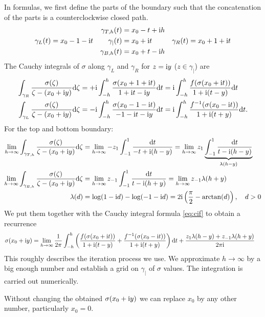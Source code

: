 In formulas, we first define the parts of the boundary such that the
concatenation of the parts is a counterclockwise closed path.
\begin{align*}
  &&\gamma_{T,h}(t)&=x_0-t+\mathrm{i} h&&\\
  \gamma_L(t)&=x_0-1-\mathrm{i} t &\gamma_|(t)&=x_0+\mathrm{i} t& \gamma_R(t)&=x_0+1+\mathrm{i} t\\
  &&\gamma_{B,h}(t)&=x_0+t-\mathrm{i} h&&
\end{align*}
The Cauchy integrals of $\sigma$ along $\gamma_L$ and $\gamma_R$ for
$z=\mathrm{i} y$ ($z\in\gamma_|$) are 
\begin{align*}
  \int_{\gamma_R}\frac{\sigma(\zeta)}{\zeta-(x_0+\mathrm{i} y)}\mathrm{d}\zeta 
   &= +\mathrm{i}\int_{-h}^h \frac{\sigma(x_0+1+\mathrm{i} t)}{1+\mathrm{i} t- \mathrm{i} y} \mathrm{d} t
   = \mathrm{i}\int_{-h}^h \frac{f(\sigma(x_0+\mathrm{i} t))}{1+\mathrm{i} (t-y)} \mathrm{d} t
  \\\int_{\gamma_L}\frac{\sigma(\zeta)}{\zeta-(x_0+\mathrm{i} y)}\mathrm{d}\zeta 
   &=-\mathrm{i}\int_{-h}^h \frac{\sigma(x_0-1-\mathrm{i} t)}{-1-\mathrm{i} t -\mathrm{i} y} \mathrm{d} t
   =\mathrm{i}\int_{-h}^h \frac{f^{-1}(\sigma(x_0-\mathrm{i} t))}{1+\mathrm{i} (t+y)} \mathrm{d} t.
\end{align*}
For the top and bottom boundary:
\begin{align*}
    \lim_{h\to\infty}\int_{\gamma_{T,h}}\frac{\sigma(\zeta)}{\zeta-(x_0+\mathrm{i}
      y)}\mathrm{d}\zeta
   &= \lim_{h\to\infty} -z_1\int_{-1}^{1}\frac{\mathrm{d} t}{-t+\mathrm{i} (h -
       y)}
   = \lim_{h\to\infty} z_1\underbrace{\int_{-1}^{1}\frac{\mathrm{d} t}{t-\mathrm{i} (h -
       y)}}_{\lambda(h-y)}
  \\\lim_{h\to\infty}\int_{\gamma_{B,h}}\frac{\sigma(\zeta)}{\zeta-(x_0+\mathrm{i}
    y)}\mathrm{d}\zeta
   &= \lim_{h\to\infty}z_{-1}\int_{-1}^{1}\frac{\mathrm{d} t}{t-\mathrm{i} (h + y)}
    = \lim_{h\to\infty} z_{-1}\lambda(h+y)
  \\\lambda(d) &= \log(1-\mathrm{i} d) - \log(-1-\mathrm{i} d) =
  2\mathrm{i}\left(\frac{\pi}{2}-\arctan(d)\right), \quad d>0
\end{align*}
We put them together with the Cauchy integral formula \ref{eq:cif}
to obtain a recurrence
\begin{align*}
\sigma(x_0+\mathrm{i} y)&=\lim_{h\to\infty}\frac{1}{2\pi} \int_{-h}^h\left(
   \frac{f(\sigma(x_0+\mathrm{i} t))}{1+\mathrm{i} (t- y)}
   +\frac{f^{-1}(\sigma(x_0-\mathrm{i} t))}{1+\mathrm{i} (t+ y)}
   \right)\mathrm{d} t + \frac{z_1\lambda(h-y) +
     z_{-1}\lambda(h+y)}{2\pi \mathrm{i}}
\end{align*}
This roughly describes the iteration process we use. We approximate
$h\to\infty$ by a big enough number and establish a grid on $\gamma_|$
of $\sigma$ values. The integration is carried out numerically.

Without changing the obtained $\sigma(x_0+\mathrm{i} y)$ we can replace $x_0$ by any other
number, particularly $x_0=0$.

